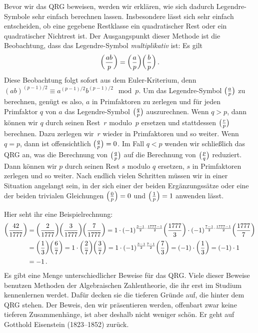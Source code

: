 Bevor wir das QRG beweisen, werden wir erklären, wie sich dadurch Legendre-Symbole sehr einfach berechnen lassen. Insbesondere lässt sich sehr einfach entscheiden, ob eine gegebene Restklasse ein quadratischer Rest oder ein quadratischer Nichtrest ist. Der Ausgangspunkt dieser Methode ist die Beobachtung, dass das Legendre-Symbol \emph{multiplikativ} ist: Es gilt
\begin{equation*}
	\parens*{\frac{ab}{p}}=\parens*{\frac{a}{p}}
	\parens*{\frac{b}{p}}\,.
\end{equation*}
Diese Beobachtung folgt sofort aus dem Euler-Kriterium, denn $(ab)^{(p-1)/2}\equiv a^{(p-1)/2}b^{(p-1)/2}\mod p$. Um das Legendre-Symbol $\parens[\big]{\frac{a}{p}}$ zu berechnen, genügt es also, $a$ in Primfaktoren zu zerlegen und für jeden Primfaktor $q$ von $a$ das Legendre-Symbol $\parens[\big]{\frac{q}{p}}$ auszurechnen. Wenn $q>p$, dann können wir $q$ durch seinen Rest~$r$ modulo~$p$ ersetzen und stattdessen $\parens[\big]{\frac{r}{p}}$ berechnen. Dazu zerlegen wir~$r$ wieder in Primfaktoren und so weiter. Wenn $q=p$, dann ist offensichtlich $\parens[\big]{\frac{q}{p}}=0$. Im Fall $q<p$ wenden wir schließlich das QRG an, was die Berechnung von $\parens[\big]{\frac{q}{p}}$ auf die Berechnung von $\parens[\big]{\frac{p}{q}}$ reduziert. Dann können wir $p$ durch seinen Rest $s$ modulo $q$ ersetzen, $s$ in Primfaktoren zerlegen und so weiter. Nach endlich vielen Schritten müssen wir in einer Situation angelangt sein, in der sich einer der beiden Ergänzungssätze oder eine der beiden trivialen Gleichungen $\parens*{\frac{0}{p}}=0$ und $\parens*{\frac{1}{p}}=1$ anwenden lässt.

Hier seht ihr eine Beispielrechnung:
\begin{align*}
	\parens*{\frac{42}{1777}}&=\parens*{\frac{2}{1777}}\parens*{\frac{3}{1777}}\parens*{\frac{7}{1777}}=1\cdot (-1)^{\frac{3-1}{2}\cdot \frac{1777-1}{2}}\parens*{\frac{1777}{3}}\cdot (-1)^{\frac{7-1}{2}\cdot \frac{1777-1}{2}}\parens*{\frac{1777}{7}}\\
	&=\parens*{\frac{1}{3}}\parens*{\frac{6}{7}}=1\cdot \parens*{\frac{2}{7}}\parens*{\frac{3}{7}}=1\cdot (-1)^{\frac{3-1}{2}\frac{7-1}{2}}\parens*{\frac{7}{3}}=(-1)\cdot \parens*{\frac{1}{3}}=(-1)\cdot 1\\
	&=-1\,.
\end{align*}
Es gibt eine Menge unterschiedlicher Beweise für das QRG. Viele dieser Beweise benutzen Methoden der Algebraischen Zahlentheorie, die ihr erst im Studium kennenlernen werdet. Dafür decken sie die tieferen Gründe auf, die hinter dem QRG stehen. Der Beweis, den wir präsentieren werden, offenbart zwar keine tieferen Zusammenhänge, ist aber deshalb nicht weniger schön. Er geht auf Gotthold Eisenstein (1823--1852) zurück.

